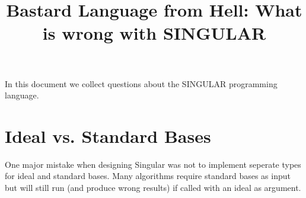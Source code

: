 \documentclass[a4paper]{article}
\title{Bastard Language from Hell: What is wrong with SINGULAR}
\begin{document}
In this document we collect questions about the SINGULAR programming
language. 

\section{Ideal vs. Standard Bases}
\label{sec:ideal-vs.-standard}

One major mistake when designing Singular was not to implement
seperate types for ideal and standard bases. Many algorithms require
standard bases as input but will still run (and produce wrong results)
if called with an ideal as argument. 
\end{document}
